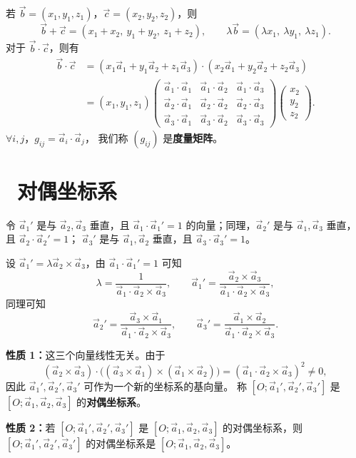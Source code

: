 \documentclass[UTF8,11pt]{ctexart}
\theoremstyle{cnthm}
\begin{document}
若 $\vec b=(x_1,y_1,z_1)$，$\vec c=(x_2,y_2,z_2)$，则
\[
\vec b+\vec c=(x_1+x_2,\ y_1+y_2,\ z_1+z_2),
\qquad
\lambda\vec b=(\lambda x_1,\ \lambda y_1,\ \lambda z_1).
\]
对于 $\vec b\cdot\vec c$，则有
\[
\begin{aligned}
\vec b\cdot\vec c
&=(x_1\vec a_1+y_1\vec a_2+z_1\vec a_3)
\cdot(x_2\vec a_1+y_2\vec a_2+z_2\vec a_3)\\
&=(x_1,y_1,z_1)
\begin{pmatrix}
\vec a_1\cdot\vec a_1 & \vec a_1\cdot\vec a_2 & \vec a_1\cdot\vec a_3\\
\vec a_2\cdot\vec a_1 & \vec a_2\cdot\vec a_2 & \vec a_2\cdot\vec a_3\\
\vec a_3\cdot\vec a_1 & \vec a_3\cdot\vec a_2 & \vec a_3\cdot\vec a_3
\end{pmatrix}
\begin{pmatrix}
x_2\\y_2\\z_2
\end{pmatrix}.
\end{aligned}
\]
$\forall i,j$，$g_{ij}=\vec a_i\cdot\vec a_j$，
我们称 $(g_{ij})$ 是\textbf{度量矩阵}。

\section{\ 对偶坐标系}

令 $\vec a_1'$ 是与 $\vec a_2,\vec a_3$ 垂直，且
$\vec a_1\cdot\vec a_1'=1$ 的向量；同理，$\vec a_2'$ 是与
$\vec a_1,\vec a_3$ 垂直，且 $\vec a_2\cdot\vec a_2'=1$；
$\vec a_3'$ 是与 $\vec a_1,\vec a_2$ 垂直，且
$\vec a_3\cdot\vec a_3'=1$。

设 $\vec a_1'=\lambda\vec a_2\times\vec a_3$，由
$\vec a_1\cdot\vec a_1'=1$ 可知
\[
\lambda=\frac{1}{\vec a_1\cdot\vec a_2\times\vec a_3},
\qquad
\vec a_1'=\frac{\vec a_2\times\vec a_3}
{\vec a_1\cdot\vec a_2\times\vec a_3},
\]
同理可知
\[
\vec a_2'=\frac{\vec a_3\times\vec a_1}
{\vec a_1\cdot\vec a_2\times\vec a_3},\qquad
\vec a_3'=\frac{\vec a_1\times\vec a_2}
{\vec a_1\cdot\vec a_2\times\vec a_3} .
\]

\textbf{性质 1：}这三个向量线性无关。由于
\[
(\vec a_2\times\vec a_3)\cdot
\bigl((\vec a_3\times\vec a_1)\times(\vec a_1\times\vec a_2)\bigr)
=(\vec a_1\cdot\vec a_2\times\vec a_3)^2\neq0,
\]
因此 $\vec a_1',\vec a_2',\vec a_3'$ 可作为一个新的坐标系的基向量。
称 $[O;\vec a_1',\vec a_2',\vec a_3']$ 是
$[O;\vec a_1,\vec a_2,\vec a_3]$ 的\textbf{对偶坐标系}。

\textbf{性质 2：}若 $[O;\vec a_1',\vec a_2',\vec a_3']$ 是
$[O;\vec a_1,\vec a_2,\vec a_3]$ 的对偶坐标系，则
$[O;\vec a_1',\vec a_2',\vec a_3']$ 的对偶坐标系是
$[O;\vec a_1,\vec a_2,\vec a_3]$。
\end{document}
